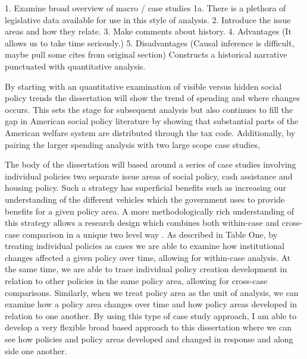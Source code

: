 \documentclass[12pt]{article}
\begin{document}
1. Examine broad overview of macro / case studies
1a. There is a plethora of legislative data available for use in this style of analysis. 
2. Introduce the issue areas and how they relate.
3. Make comments about history.
4. Advantages (It allows us to take time seriously.)
5. Disadvantages (Causal inference is difficult, maybe pull some cites from original section)
Constructs a historical narrative punctuated with quantitative analysis. 

By starting with an quantitative examination of visible versus hidden social policy trends the dissertation will show the trend of spending and where changes occurs. This sets the stage for subsequent analysis but also continues to fill the gap in American social policy literature by showing that substantial parts of the American welfare system are distributed through the tax code. Additionally, by pairing the larger spending analysis with two large scope case studies, 

The body of the dissertation will based around a series of case studies involving individual policies two separate issue areas of social policy, cash assistance and housing policy. Such a strategy has superficial benefits such as increasing our understanding of the different vehicles which the government uses to provide benefits for a given policy area. A more methodologically rich understanding of this strategy allows a research design which combines both within-case and cross-case comparison in a unique two level way \citep{george2005, goertz2012}. As described in Table One, by treating individual policies as cases we are able to examine how institutional changes affected a given policy over time, allowing for within-case analysis. At the same time, we are able to trace individual policy creation development in relation to other policies in the same policy area, allowing for cross-case comparisons. Similarly, when we treat policy area as the unit of analysis, we can examine how a policy area changes over time and how policy areas developed in relation to one another. By using this type of case study approach, I am able to develop a very flexible broad based approach to this dissertation where we can see how policies and policy areas developed and changed in response and along side one another. 

\end{document}
